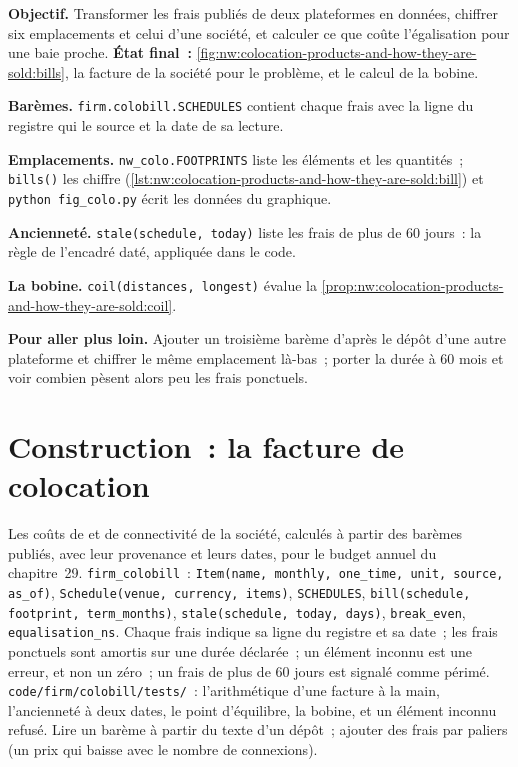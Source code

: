 \begin{tutorial}
\textbf{Objectif.} Transformer les frais publiés de deux plateformes en données, chiffrer six emplacements et celui d'une société, et calculer ce que coûte l'égalisation pour une
baie proche. \textbf{État final~:} \cref{fig:nw:colocation-products-and-how-they-are-sold:bills}, la facture de la société pour le problème, et le calcul
de la bobine.
\begin{tutsteps}
\item \textbf{Barèmes.} \texttt{firm.colobill.SCHEDULES} contient chaque frais avec la ligne du registre qui le source et la date de sa lecture.
\item \textbf{Emplacements.} \texttt{nw\_colo.FOOTPRINTS} liste les éléments et les quantités~; \texttt{bills()} les chiffre
  (\cref{lst:nw:colocation-products-and-how-they-are-sold:bill}) et \texttt{python fig\_colo.py} écrit les données du graphique.
\item \textbf{Ancienneté.} \texttt{stale(schedule, today)} liste les frais de plus de 60 jours~: la règle de l'encadré daté, appliquée dans le code.
\item \textbf{La bobine.} \texttt{coil(distances, longest)} évalue la \cref{prop:nw:colocation-products-and-how-they-are-sold:coil}.
\end{tutsteps}
\textbf{Pour aller plus loin.} Ajouter un troisième barème d'après le dépôt d'une autre plateforme et chiffrer le même emplacement là-bas~; porter la durée à 60
mois et voir combien pèsent alors peu les frais ponctuels.
\end{tutorial}

\section{Construction~: la facture de colocation}\label{bld:nw:colocation-products-and-how-they-are-sold:colobill}

\begin{build}
 Les coûts de  et de connectivité de la société, calculés à partir des barèmes publiés, avec leur provenance et leurs dates, pour
le budget annuel du chapitre~29.
 \texttt{firm\_colobill}~: \texttt{Item(name, monthly, one\_time, unit, source, as\_of)},
\texttt{Schedule(venue, currency, items)}, \texttt{SCHEDULES}, \texttt{bill(schedule, footprint, term\_months)}, \texttt{stale(schedule, today, days)}, \texttt{break\_even},
\texttt{equalisation\_ns}.
 Chaque frais indique sa ligne du registre et sa date~; les frais ponctuels sont amortis sur une durée déclarée~; un élément inconnu est une erreur, et non un zéro~;
un frais de plus de 60 jours est signalé comme périmé.
 \texttt{code/firm/colobill/tests/}~: l'arithmétique d'une facture à la main, l'ancienneté à deux dates, le point d'équilibre, la bobine, et
un élément inconnu refusé.
 Lire un barème à partir du texte d'un dépôt~; ajouter des frais par paliers (un prix qui baisse avec le nombre de connexions).
\end{build}

